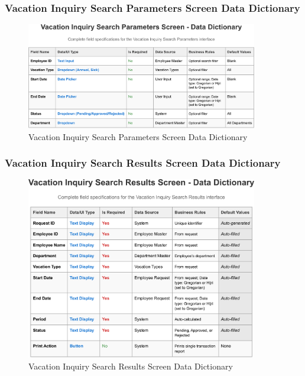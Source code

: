 \documentclass[12pt,a4paper]{article}
\begin{document}
\subsubsection{Vacation Inquiry Search Parameters Screen Data Dictionary}
\begin{figure}[H]
\centering
\includegraphics[width=0.9\textwidth]{Data-Dictionary/Screen-Data-Dictionaries/Vacation-Inquiry-Search-Parameters-Screen-Data-Dictionary/Vacation-Inquiry-Search-Parameters-Screen-Data-Dictionary-1.png}
\caption{Vacation Inquiry Search Parameters Screen Data Dictionary}
\label{fig:inquiry-search-params-data-dict}
\end{figure}

\subsubsection{Vacation Inquiry Search Results Screen Data Dictionary}
\begin{figure}[H]
\centering
\includegraphics[width=0.9\textwidth]{Data-Dictionary/Screen-Data-Dictionaries/Vacation-Inquiry-Search-Results-Screen-Data-Dictionary/Vacation-Inquiry-Search-Results-Screen-Data-Dictionary-1.png}
\caption{Vacation Inquiry Search Results Screen Data Dictionary}
\label{fig:inquiry-search-results-data-dict}
\end{figure}
\end{document}
